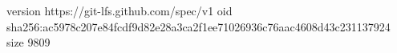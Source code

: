 version https://git-lfs.github.com/spec/v1
oid sha256:ac5978c207e84fcdf9d82e28a3ca2f1ee71026936c76aac4608d43c231137924
size 9809
